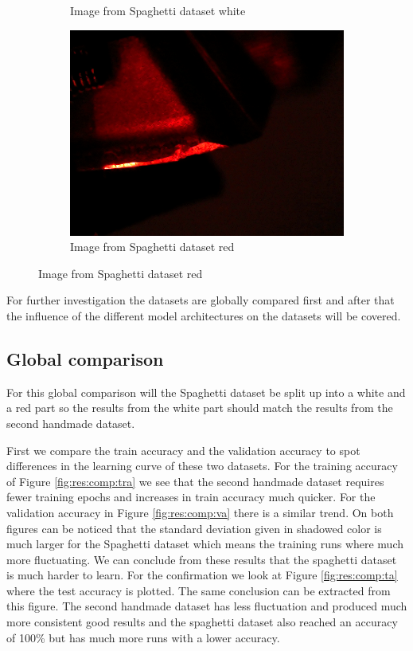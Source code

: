 \begin{figure}[hbtp]
\begin{subfigure}{0.31\textwidth}
				\caption{Image from Spaghetti dataset white}
				\label{fig:res:comp:sd:white}
		\end{subfigure}
		\hspace*{\fill}
		\begin{subfigure}{0.31\textwidth}
			\centering
			\includegraphics[width=\linewidth]{fig/Vision/Dataset/automated_datasets/2_created_datasets/2_Spaghetti_dataset/b_018_p_002_l_006-011_red_nb.png}
				\caption{Image from Spaghetti dataset red}
				\label{fig:res:comp:sd:red}
		\end{subfigure}
		\label{fig:res:comp:sd}
	\end{figure}
	
	For further investigation the datasets are globally compared first and after that the influence of the different model architectures on the datasets will be covered.

	\subsection{Global comparison}
	For this global comparison will the Spaghetti dataset be split up into a white and a red part so the results from the white part should match the results from the second handmade dataset. 
	
	First we compare the train accuracy and the validation accuracy to spot differences in the learning curve of these two datasets. For the training accuracy of Figure \ref{fig:res:comp:tra} we see that the second handmade dataset requires fewer training epochs and increases in train accuracy much quicker. For the validation accuracy in Figure \ref{fig:res:comp:va} there is a similar trend. 
	On both figures can be noticed that the standard deviation given in shadowed color is much larger for the Spaghetti dataset which means the training runs where much more fluctuating. 
	We can conclude from these results that the spaghetti dataset is much harder to learn. For the confirmation we look at Figure \ref{fig:res:comp:ta} where the test accuracy is plotted. The same conclusion can be extracted from this figure. The second handmade dataset has less fluctuation and produced much more consistent good results and the spaghetti dataset also reached an accuracy of 100\% but has much more runs with a lower accuracy. 

